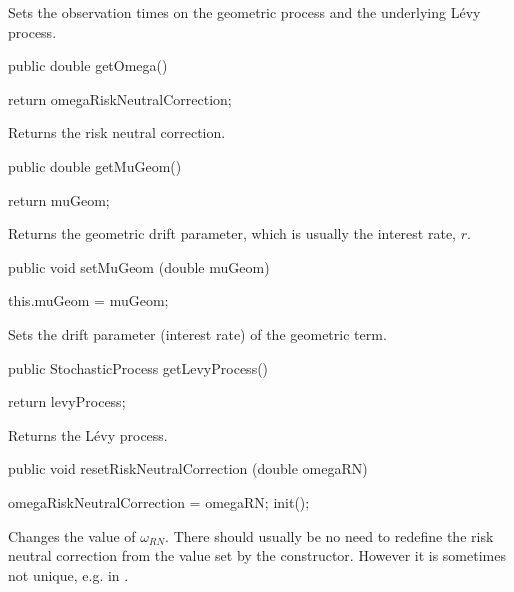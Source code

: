 \begin{tabb} Sets the observation times on the geometric process
and the underlying L\'evy process.
\end{tabb}
\begin{code}

   public double getOmega() \begin{hide} {
        return omegaRiskNeutralCorrection;
    }\end{hide}
\end{code}
\begin{tabb} Returns the risk neutral correction.
\end{tabb}
\begin{code}

   public double getMuGeom() \begin{hide} {
        return muGeom;
    }\end{hide}
\end{code}
\begin{tabb} Returns the geometric drift parameter,
which is usually the interest rate, $r$.
\end{tabb}
\begin{code}

   public void setMuGeom (double muGeom) \begin{hide} {
        this.muGeom = muGeom;
    }\end{hide}
\end{code}
\begin{tabb} Sets the drift parameter (interest rate) of the geometric term.
\end{tabb}
\begin{code}

   public StochasticProcess getLevyProcess() \begin{hide} {
        return levyProcess;
    }\end{hide}
\end{code}
\begin{tabb} Returns the L\'evy process.
\end{tabb}
\begin{code}

   public void resetRiskNeutralCorrection (double omegaRN) \begin{hide} {
       omegaRiskNeutralCorrection = omegaRN;
       init();
    }\end{hide}
\end{code}
\begin{tabb}
Changes the value of $\omega_{RN}$.
There should usually be no need to redefine the risk neutral
correction from the value set by the constructor.  However it
is sometimes not unique, e.g. in 
\cite{fALB04a}.
\end{tabb}
